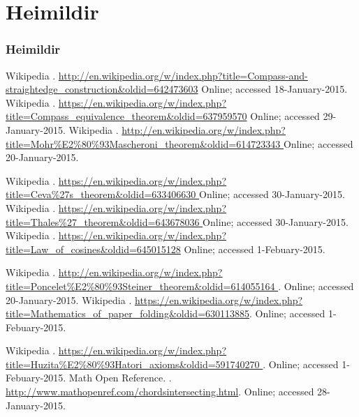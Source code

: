 \section{Heimildir}
\begin{frame}[allowframebreaks]

  \frametitle<presentation>{Heimildir} 
  
  \begin{thebibliography}{10}    
  \beamertemplateonlinebibitems
     Wikipedia
     .
     \newblock \url{http://en.wikipedia.org/w/index.php?title=Compass-and-straightedge_construction&oldid=642473603}
     \newblock Online; accessed 18-January-2015.
     Wikipedia
     .
     \newblock \url{https://en.wikipedia.org/w/index.php?title=Compass_equivalence_theorem&oldid=637959570}
     \newblock Online; accessed 29-January-2015.
     Wikipedia
     .
     \newblock \url{http://en.wikipedia.org/w/index.php?title=Mohr%
     }
     \newblock Online; accessed 20-January-2015.

     Wikipedia
     .
     \newblock \url{https://en.wikipedia.org/w/index.php?title=Ceva%
     }
     \newblock Online; accessed 30-January-2015.
     Wikipedia
     .
     \newblock \url{https://en.wikipedia.org/w/index.php?title=Thales%
     }
     \newblock Online; accessed 30-January-2015.
     Wikipedia
     .
     \newblock \url{https://en.wikipedia.org/w/index.php?title=Law_of_cosines&oldid=645015128}
     \newblock Online; accessed 1-Febuary-2015.
     
     Wikipedia
     .
     \newblock  \url{http://en.wikipedia.org/w/index.php?title=Poncelet%
     }.
     \newblock Online; accessed 20-January-2015.
     Wikipedia
     .
     \newblock  \url{https://en.wikipedia.org/w/index.php?title=Mathematics_of_paper_folding&oldid=630113885}.
     \newblock Online; accessed 1-Febuary-2015.
     
     Wikipedia
     .
     \newblock  \url{https://en.wikipedia.org/w/index.php?title=Huzita%
     }.
     \newblock Online; accessed 1-Febuary-2015.
     Math Open Reference.
     .
     \newblock \url{http://www.mathopenref.com/chordsintersecting.html}.
     \newblock Online; accessed 28-January-2015.


\end{thebibliography}
\end{frame}
